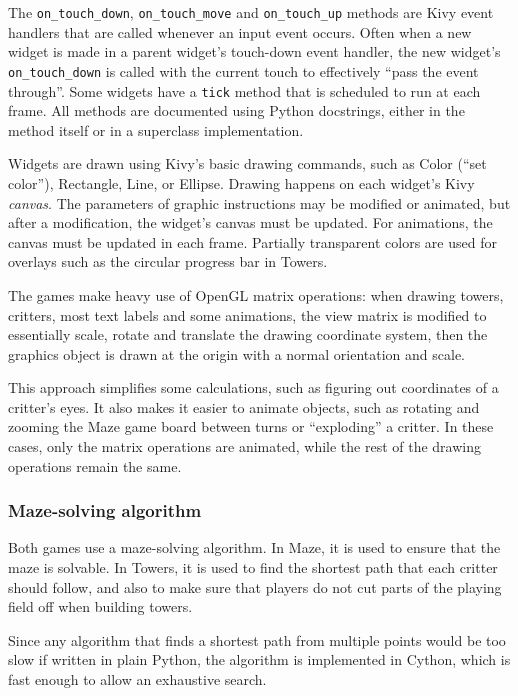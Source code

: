 \documentclass[a4paper,11pt]{article}
\begin{document}
The \texttt{on\_touch\_down}, \texttt{on\_touch\_move} and
\texttt{on\_touch\_up} methods are Kivy event handlers that are called whenever
an input event occurs.
Often when a new widget is made in a parent widget's touch-down event handler,
the new widget's \texttt{on\_touch\_down} is called with the current touch
to effectively “pass the event through”.
Some widgets have a \texttt{tick} method that is scheduled to run at each
frame.
All methods are documented using Python docstrings, either in the method
itself or in a superclass implementation.

Widgets are drawn using Kivy's basic drawing commands, such as Color
(“set color”), Rectangle, Line, or Ellipse.
Drawing happens on each widget's Kivy \emph{canvas}.
The parameters of graphic instructions may be modified or animated, but after
a modification, the widget's canvas must be updated. For animations, the canvas
must be updated in each frame.
Partially transparent colors are used for overlays such as the circular
progress bar in Towers.

The games make heavy use of OpenGL matrix operations:
when drawing towers, critters, most text labels and some animations,
the view matrix is modified to essentially scale, rotate and translate the
drawing coordinate system, then the graphics object is drawn at the origin
with a normal orientation and scale.

This approach simplifies some calculations, such as figuring out coordinates
of a critter's eyes.
It also makes it easier to animate objects, such as rotating and zooming
the Maze game board between turns or “exploding” a critter.
In these cases, only the matrix operations are animated, while the rest of
the drawing operations remain the same.

\subsubsection{Maze-solving algorithm}

Both games use a maze-solving algorithm.
In Maze, it is used to ensure that the maze is solvable.
In Towers, it is used to find the shortest path that each critter should
follow, and also to make sure that players do not cut parts of the playing
field off when building towers.

Since any algorithm that finds a shortest path from multiple points would
be too slow if written in plain Python, the algorithm is implemented in Cython,
which is fast enough to allow an exhaustive search.
\end{document}
